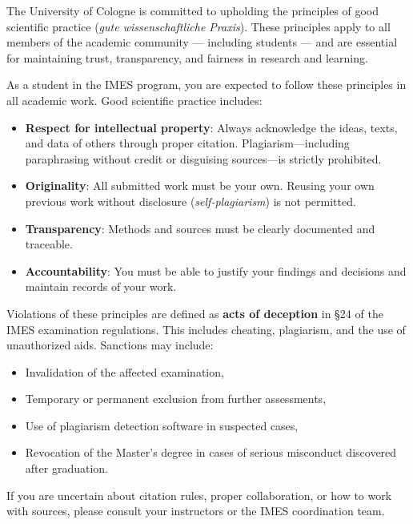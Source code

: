 \documentclass[
  letterpaper,
  10pt,
  openany]{book}
\providecommand{\tightlist}{%
  \setlength{\itemsep}{0pt}\setlength{\parskip}{0pt}}\usepackage{longtable,booktabs,array}
\begin{document}

The University of Cologne is committed to upholding the principles of
good scientific practice (\emph{gute wissenschaftliche Praxis}). These
principles apply to all members of the academic community --- including
students --- and are essential for maintaining trust, transparency, and
fairness in research and learning.

As a student in the IMES program, you are expected to follow these
principles in all academic work. Good scientific practice includes:

\begin{itemize}
\tightlist
\item
  \textbf{Respect for intellectual property}: Always acknowledge the
  ideas, texts, and data of others through proper citation.
  Plagiarism---including paraphrasing without credit or disguising
  sources---is strictly prohibited.
\item
  \textbf{Originality}: All submitted work must be your own. Reusing
  your own previous work without disclosure (\emph{self-plagiarism}) is
  not permitted.
\item
  \textbf{Transparency}: Methods and sources must be clearly documented
  and traceable.
\item
  \textbf{Accountability}: You must be able to justify your findings and
  decisions and maintain records of your work.
\end{itemize}

Violations of these principles are defined as \textbf{acts of deception}
in §24 of the IMES examination regulations. This includes cheating,
plagiarism, and the use of unauthorized aids. Sanctions may include:

\begin{itemize}
\tightlist
\item
  Invalidation of the affected examination,
\item
  Temporary or permanent exclusion from further assessments,
\item
  Use of plagiarism detection software in suspected cases,
\item
  Revocation of the Master's degree in cases of serious misconduct
  discovered after graduation.
\end{itemize}

If you are uncertain about citation rules, proper collaboration, or how
to work with sources, please consult your instructors or the IMES
coordination team.
\end{document}
